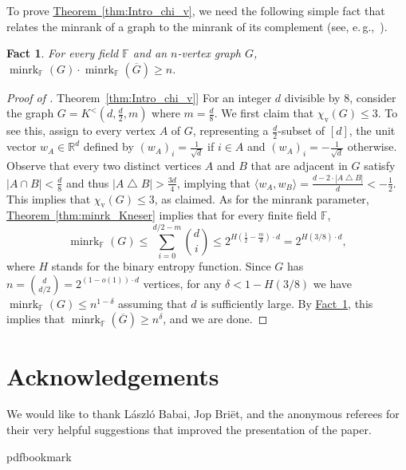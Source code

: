 \documentclass[11pt]{article}
\numberwithin{equation}{section}
\newtheorem{fact}[theorem]{Fact}
\theoremstyle{definition}
\theoremstyle{plain}
\newcommand{\R}{\mathbb R}
\newcommand{\expref}[2]{\hyperref[#2]{#1~\ref{#2}}}
\newcommand{\Fset}{\mathbb{F}}
\newcommand{\minrank}{\mathop{\mathrm{minrk}}}
\newcommand{\vchrom}{{\chi_\mathrm{v}}}
\newcommand\Kneser[3]{K^<(#1,#2,#3)}
\begin{document}
To prove \expref{Theorem}{thm:Intro_chi_v}, we need the following simple fact that relates the minrank of a graph to the minrank of its complement (see, e.\,g.,~\cite[Remark~2.2]{Peeters96}).

\begin{fact}\label{fact:minrank_comp}
For every field $\Fset$ and an $n$-vertex graph $G$, $\minrank_{\Fset}(G) \cdot \minrank_{\Fset}(\overline{G}) \geq n$.
\end{fact}

\begin{proof}[Proof of \expref{Theorem}{thm:Intro_chi_v}]
For an integer $d$ divisible by $8$, consider the graph $G = \Kneser{d}{\frac{d}{2}}{m}$ where $m = \frac{d}{8}$.
We first claim that $\vchrom(G) \leq 3$.
To see this, assign to every vertex $A$ of $G$, representing a $\frac{d}{2}$-subset of $[d]$, the unit vector $w_A \in \R^d$ defined by $(w_A)_i = \frac{1}{\sqrt{d}}$ if $i \in A$ and $(w_A)_i = - \frac{1}{\sqrt{d}}$ otherwise.
Observe that every two distinct vertices $A$ and $B$ that are adjacent in $G$ satisfy $|A \cap B| < \frac{d}{8}$ and thus $|A \bigtriangleup B| > \frac{3d}{4}$, implying that $\langle w_A, w_B \rangle = \frac{d-2 \cdot |A \bigtriangleup B|}{d} < -\frac{1}{2}$. This implies that $\vchrom(G) \leq 3$, as claimed.
As for the minrank parameter, \expref{Theorem}{thm:minrk_Kneser} implies that for every finite field $\Fset$,
\[{\minrank}_{\Fset}(G) \leq \sum_{i=0}^{d/2-m}\binom{d}{i} \leq 2^{H(\frac{1}{2}-\frac{m}{d}) \cdot d} = 2^{H(3/8) \cdot d},\]
where $H$ stands for the binary entropy function.
Since $G$ has $n = \binom{d}{d/2} = 2^{(1-o(1)) \cdot d}$ vertices, for any $\delta < 1- H(3/8)$ we have ${\minrank}_{\Fset}(G) \leq n^{1-\delta}$ assuming that $d$ is sufficiently large. By \expref{Fact}{fact:minrank_comp}, this implies that
${\minrank}_{\Fset}(\overline{G}) \geq n^{\delta}$, and we are done.
\end{proof}

\section*{Acknowledgements}
%
%
We would like to thank L{\'{a}}szl{\'{o}} Babai, Jop Bri{\"{e}}t, and the anonymous referees for their very helpful suggestions that improved the presentation of the paper.


\newcommand{\prelim}{Preliminary version in\ }\newcommand{\prelims}{Preliminary
  versions in\ }
\providecommand{\bibhead}[1]{}
\expandafter\ifx\csname pdfbookmark\endcsname\relax%
  \providecommand{\tocrefpdfbookmark}{}
\else\providecommand{\tocrefpdfbookmark}{%
   \hypertarget{tocreferences}{}%
   \pdfbookmark[1]{References}{tocreferences}}%
\fi
\end{document}
